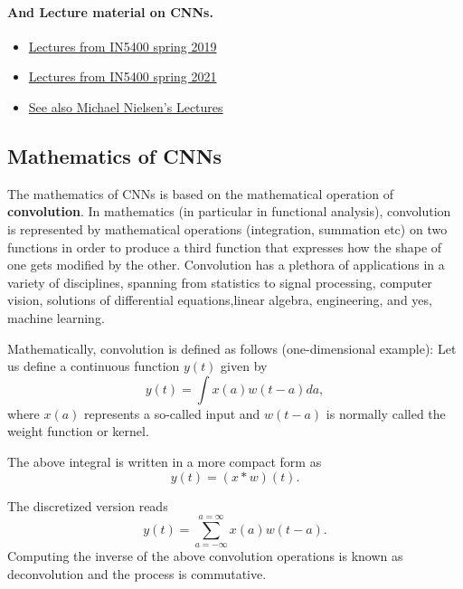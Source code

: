 \documentclass[%
oneside,                 %
final,                   %
10pt]{article}
\begin{document}
\paragraph{And Lecture material on CNNs.}
\begin{itemize}
\item \href{{https://www.uio.no/studier/emner/matnat/ifi/IN5400/v19/material/week5/in5400_2019_week5_convolutional_nerual_networks.pdf}}{Lectures from IN5400 spring 2019}

\item \href{{https://www.uio.no/studier/emner/matnat/ifi/IN5400/v21/lecture-slides/in5400_2021_w5_lecture_convolutions.pdf}}{Lectures from IN5400 spring 2021}

\item \href{{http://neuralnetworksanddeeplearning.com/chap6.html}}{See also Michael Nielsen's Lectures}
\end{itemize}

\noindent



\subsection{Mathematics of CNNs}

The mathematics of CNNs is based on the mathematical operation of
\textbf{convolution}.  In mathematics (in particular in functional analysis),
convolution is represented by mathematical operations (integration,
summation etc) on two functions in order to produce a third function
that expresses how the shape of one gets modified by the other.
Convolution has a plethora of applications in a variety of
disciplines, spanning from statistics to signal processing, computer
vision, solutions of differential equations,linear algebra,
engineering, and yes, machine learning.

Mathematically, convolution is defined as follows (one-dimensional example):
Let us define a continuous function $y(t)$ given by
\[
y(t) = \int x(a) w(t-a) da,
\]
where $x(a)$ represents a so-called input and $w(t-a)$ is normally called the weight function or kernel.

The above integral is written in  a more compact form as
\[
y(t) = \left(x * w\right)(t).
\]

The discretized version reads
\[
y(t) = \sum_{a=-\infty}^{a=\infty}x(a)w(t-a).
\]
Computing the inverse of the above convolution operations is known as deconvolution and the process is commutative.
\end{document}
